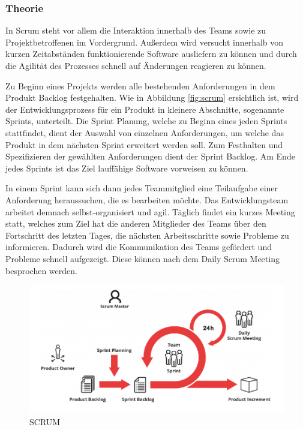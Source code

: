 \subsubsection{Theorie}
In Scrum steht vor allem die Interaktion innerhalb des Teams sowie zu Projektbetroffenen im Vordergrund. Außerdem wird versucht innerhalb von kurzen Zeitabständen funktionierende Software ausliefern zu können und durch die Agilität des Prozesses schnell auf Änderungen reagieren zu können. 

Zu Beginn eines Projekts werden alle bestehenden Anforderungen in dem Produkt Backlog festgehalten. Wie in Abbildung \vref{fig:scrum} ersichtlich ist, wird der Entwicklungsprozess für ein Produkt in kleinere Abschnitte, sogenannte Sprints, unterteilt. Die Sprint Planung, welche zu Beginn eines jeden Sprints stattfindet, dient der Auswahl von einzelnen Anforderungen, um welche das Produkt in dem nächsten Sprint erweitert werden soll. Zum Festhalten und Spezifizieren der gewählten Anforderungen dient der Sprint Backlog. Am Ende jedes Sprints ist das Ziel lauffähige Software vorweisen zu können. 

In einem Sprint kann sich dann jedes Teammitglied eine Teilaufgabe einer Anforderung heraussuchen, die es bearbeiten möchte. Das Entwicklungsteam arbeitet demnach selbst-organisiert und agil. Täglich findet ein kurzes Meeting statt, welches zum Ziel hat die anderen Mitglieder des Teams über den Fortschritt des letzten Tages, die nächsten Arbeitsschritte sowie Probleme zu informieren. Dadurch wird die Kommunikation des Teams gefördert und Probleme schnell aufgezeigt. Diese können nach dem Daily Scrum Meeting besprochen werden. 

\begin{figure}[H]
	\centering 
	\includegraphics[width=14cm]{img/Scrum.png}
	\captionsetup{format=hang}
	\centering\caption[Iteratives Modell]{\label{fig:scrum}SCRUM \footnotemark}
\end{figure}

